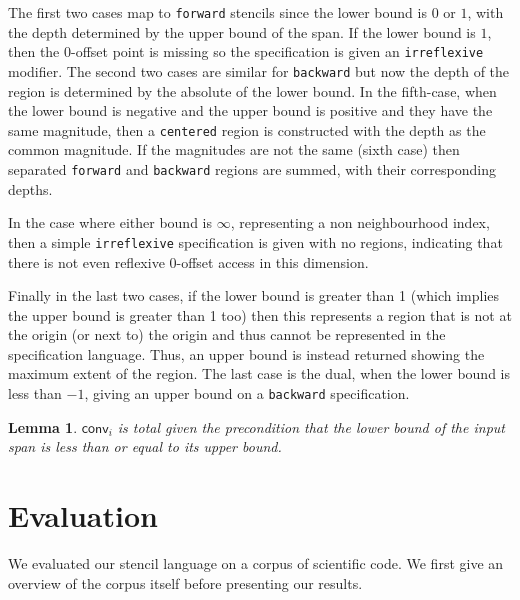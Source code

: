 \documentclass[9pt]{sigplanconf}
\newcounter{block}
\newtheorem{lemma}[block]{Lemma}
\theoremstyle{definition}
\begin{document}
The first two cases map to \texttt{forward} stencils since the lower
bound is $0$ or $1$, with the depth determined by the upper bound of
the span. If the lower bound is $1$, then the
$0$-offset point is missing so the specification is given an
\texttt{irreflexive} modifier. The second two cases are similar for
\texttt{backward} but now the depth of the region is determined by the
absolute of the lower bound. In the fifth-case, when the lower bound
is negative and the upper bound is positive and they have the same
magnitude, then a \texttt{centered} region is constructed with
the depth as the common magnitude. If the magnitudes are not the same
(sixth case) then separated \texttt{forward} and \texttt{backward}
regions are summed, with their corresponding depths.

In the case where either bound is $\infty$, representing a non
neighbourhood index, then a simple \texttt{irreflexive} specification
is given with no regions, indicating that there is not even reflexive
0-offset access in this dimension.

Finally in the last two cases, if the lower bound is greater than 1
(which implies the upper bound is greater than 1 too) then
this represents a region that is not at the origin (or next to) the
origin and thus cannot be represented in the specification language.
Thus, an upper bound is instead returned showing the maximum extent
of the region. The last case is the dual, when the lower bound is less
than $-1$, giving an upper bound on a \texttt{backward} specification.

\begin{lemma}
$\mathsf{conv}_i$ is total given the precondition that the lower
bound of the input span is less than or equal to its upper bound.
\end{lemma}

\section{Evaluation}
\label{sec:evaluation}
We evaluated our stencil language on a corpus of scientific code. We first give an overview of the corpus itself before presenting our results.
\end{document}

